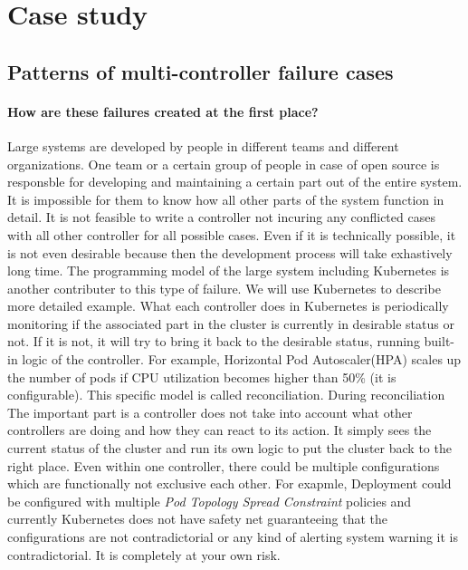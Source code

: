 \section{Case study}
\label{sec:case_study}
\subsection*{Patterns of multi-controller failure cases}

\paragraph*{How are these failures created at the first place?}
Large systems are developed by people in different teams and different organizations. One team or a certain group of people in case of open source is responsble for developing and maintaining a certain part out of the entire system. It is impossible for them to know how all other parts of the system function in detail. It is not feasible to write a controller not incuring any conflicted cases with all other controller for all possible cases. Even if it is technically possible, it is not even desirable because then the development process will take exhastively long time.
The programming model of the large system including Kubernetes is another contributer to this type of failure. We will use Kubernetes to describe more detailed example. What each controller does in Kubernetes is periodically monitoring if the associated part in the cluster is currently in desirable status or not. If it is not, it will try to bring it back to the desirable status, running built-in logic of the controller. For example, Horizontal Pod Autoscaler(HPA) scales up the number of pods if CPU utilization becomes higher than 50\% (it is configurable). This specific model is called reconciliation. During reconciliation The important part is a controller does not take into account what other controllers are doing and how they can react to its action. It simply sees the current status of the cluster and run its own logic to put the cluster back to the right place.
Even within one controller, there could be multiple configurations which are functionally not exclusive each other. For exapmle, Deployment could be configured with multiple \textit{Pod Topology Spread Constraint} policies and currently Kubernetes does not have safety net guaranteeing that the configurations are not contradictorial or any kind of alerting system warning it is contradictorial. It is completely at your own risk.


